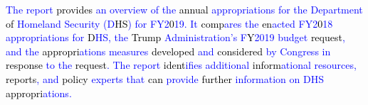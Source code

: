 \begin{tcolorbox}
    \textcolor{blue}{The} \textcolor{blue}{report} \textcolor{black}{provides} \textcolor{blue}{an} \textcolor{blue}{over}\textcolor{blue}{view} \textcolor{blue}{of} \textcolor{blue}{the} \textcolor{black}{annual} \textcolor{blue}{appropri}\textcolor{blue}{ations} \textcolor{blue}{for} \textcolor{blue}{the} \textcolor{blue}{Department} \textcolor{black}{of} \textcolor{blue}{Hom}\textcolor{blue}{eland} \textcolor{blue}{Security} \textcolor{blue}{(}\textcolor{blue}{D}\textcolor{black}{HS}\textcolor{blue}{)} \textcolor{blue}{for} \textcolor{blue}{F}\textcolor{blue}{Y}\textcolor{blue}{2}\textcolor{black}{0}\textcolor{blue}{1}\textcolor{blue}{9}\textcolor{blue}{.} \textcolor{blue}{It} \textcolor{black}{comp}\textcolor{blue}{ares} \textcolor{blue}{the} \textcolor{black}{en}\textcolor{blue}{act}\textcolor{blue}{ed} \textcolor{blue}{F}\textcolor{blue}{Y}\textcolor{blue}{2}\textcolor{black}{0}\textcolor{blue}{1}\textcolor{blue}{8} \textcolor{blue}{appropri}\textcolor{blue}{ations} \textcolor{blue}{for} \textcolor{black}{D}\textcolor{blue}{HS}\textcolor{blue}{,} \textcolor{blue}{the} \textcolor{black}{Trump} \textcolor{blue}{Administration}\textcolor{blue}{'}\textcolor{blue}{s} \textcolor{blue}{F}\textcolor{black}{Y}\textcolor{blue}{2}\textcolor{blue}{0}\textcolor{blue}{1}\textcolor{blue}{9} \textcolor{blue}{budget} \textcolor{black}{request}\textcolor{blue}{,} \textcolor{blue}{and} \textcolor{blue}{the} \textcolor{black}{appropri}\textcolor{blue}{ations} \textcolor{blue}{measures} \textcolor{black}{developed} \textcolor{blue}{and} \textcolor{black}{considered} \textcolor{blue}{by} \textcolor{blue}{Congress} \textcolor{blue}{in} \textcolor{black}{response} \textcolor{blue}{to} \textcolor{blue}{the} \textcolor{black}{request}\textcolor{blue}{.} \textcolor{blue}{The} \textcolor{blue}{report} \textcolor{black}{ident}\textcolor{blue}{ifies} \textcolor{blue}{additional} \textcolor{black}{inform}\textcolor{blue}{ational} \textcolor{blue}{resources}\textcolor{blue}{,} \textcolor{black}{reports}\textcolor{blue}{,} \textcolor{blue}{and} \textcolor{black}{policy} \textcolor{blue}{exper}\textcolor{blue}{ts} \textcolor{blue}{that} \textcolor{black}{can} \textcolor{blue}{provide} \textcolor{black}{further} \textcolor{blue}{information} \textcolor{blue}{on} \textcolor{blue}{D}\textcolor{blue}{HS} \textcolor{black}{appropri}\textcolor{blue}{ations}\textcolor{blue}{.}
    

\end{tcolorbox}
